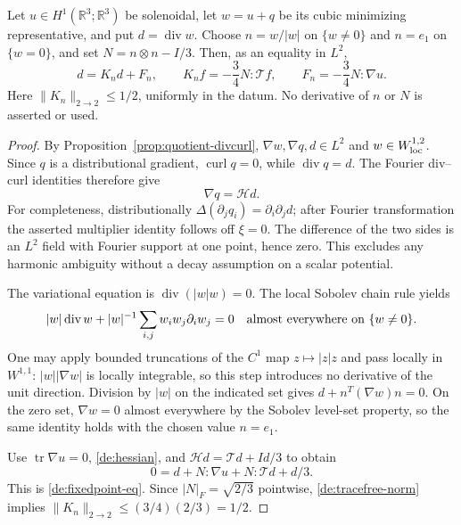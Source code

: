 \begin{lemma}
\label{de:fixedpoint}
Let $u\in H^1(\mathbb R^3;\mathbb R^3)$ be solenoidal, let $w=u+q$ be
its cubic minimizing representative, and put $d=\operatorname{div}w$.
Choose $n=w/|w|$ on $\{w\ne0\}$ and $n=e_1$ on $\{w=0\}$, and set
$N=n\otimes n-I/3$.  Then, as an equality in $L^2$,
\begin{equation}\label{de:fixedpoint-eq}
 d=K_n d+F_n,\qquad
 K_nf=-\frac34 N:\mathcal T f,\qquad F_n=-\frac34 N:\nabla u.
\end{equation}
Here $\|K_n\|_{2\to2}\le1/2$, uniformly in the datum.  No derivative
of $n$ or $N$ is asserted or used.
\end{lemma}
\begin{proof}
By Proposition~\ref{prop:quotient-divcurl}, $\nabla w,\nabla q,d\in L^2$
and $w\in W^{1,2}_{\rm loc}$.  Since $q$ is a distributional gradient,
$\operatorname{curl}q=0$, while $\operatorname{div}q=d$.  The Fourier
div--curl identities therefore give
\begin{equation}\label{de:hessian}
 \nabla q=\mathcal H d.
\end{equation}
For completeness, distributionally
$\Delta(\partial_jq_i)=\partial_i\partial_jd$; after Fourier
transformation the asserted multiplier identity follows off $\xi=0$.
The difference of the two sides is an $L^2$ field with Fourier support at
one point, hence zero.  This excludes any harmonic ambiguity without a
decay assumption on a scalar potential.

The variational equation is $\operatorname{div}(|w|w)=0$.  The local
Sobolev chain rule yields
\[
 |w|\operatorname{div}w+
 |w|^{-1}\sum_{i,j}w_iw_j\partial_iw_j=0
 \quad\hbox{almost everywhere on }\{w\ne0\}.
\]
One may apply bounded truncations of the $C^1$ map $z\mapsto|z|z$ and
pass locally in $W^{1,1}$: $|w||\nabla w|$ is locally integrable, so this
step introduces no derivative of the unit direction.  Division by $|w|$
on the indicated set gives $d+n^T(\nabla w)n=0$.  On the zero set,
$\nabla w=0$ almost everywhere by the Sobolev level-set property, so the
same identity holds with the chosen value $n=e_1$.

Use $\operatorname{tr}\nabla u=0$, \eqref{de:hessian}, and
$\mathcal H d=\mathcal T d+Id/3$ to obtain
\[
 0=d+N:\nabla u+N:\mathcal T d+d/3.
\]
This is \eqref{de:fixedpoint-eq}.  Since $|N|_F=\sqrt{2/3}$ pointwise,
\eqref{de:tracefree-norm} implies
$\|K_n\|_{2\to2}\le(3/4)(2/3)=1/2$.
\end{proof}

